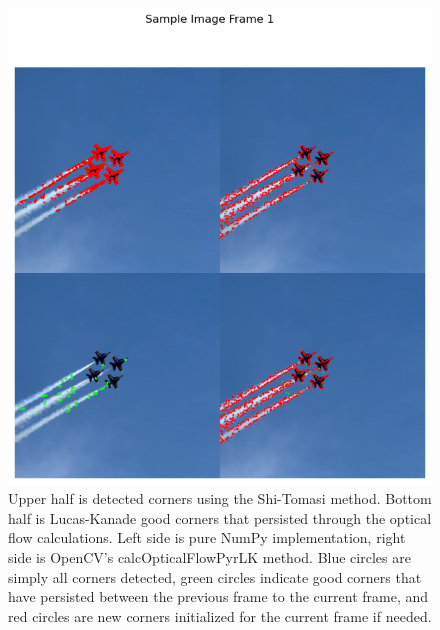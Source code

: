 \documentclass[11pt, conference, letterpaper]{IEEEtran}
\begin{document}
\begin{figure}[h]
    \centering
    \includegraphics[width=0.8\linewidth]{images/sample_image_1.png}
    \caption{Upper half is detected corners using the Shi-Tomasi method. Bottom half is Lucas-Kanade good corners that persisted through the optical flow calculations. Left side is pure NumPy implementation, right side is OpenCV's calcOpticalFlowPyrLK method. Blue circles are simply all corners detected, green circles indicate good corners that have persisted between the previous frame to the current frame, and red circles are new corners initialized for the current frame if needed.}
    \label{fig:sample_2}
\end{figure}
\end{document}

